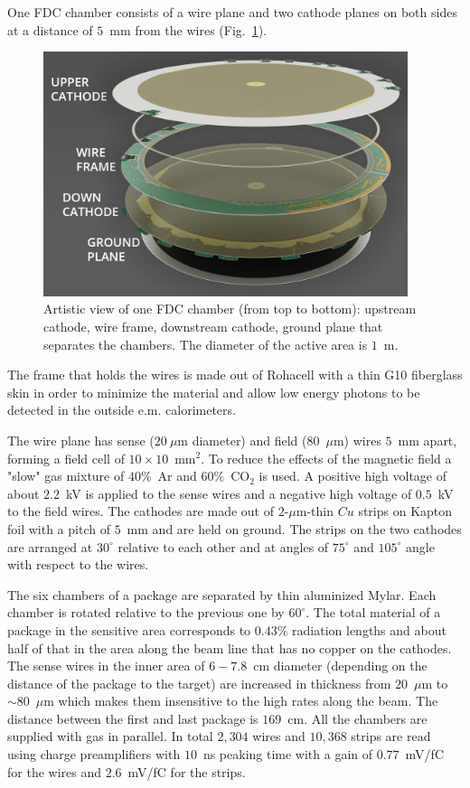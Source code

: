 One FDC chamber consists of a wire plane and two cathode planes on both sides at a distance of $5$~mm from the wires (Fig.~\ref{FDC_OneCell}).
\begin{figure}[tbp]
\begin{center}
\includegraphics[width=0.95\textwidth]{figures/FDC_OneCell2.png} 
\caption{\label{FDC_OneCell}
Artistic view of one FDC chamber (from top to bottom): upstream cathode, wire frame, downstream cathode, ground plane that separates the chambers. The diameter of the active area is $1$~m.
}
\end{center}
\end{figure}
The frame that holds the wires is made out of Rohacell with a thin
G10 fiberglass skin in order to minimize the material and
allow low energy photons to be detected in the outside e.m. calorimeters.

The wire plane has sense ($20~\mu$m diameter) and field ($80$~$\mu$m) wires $5$~mm apart, forming a field cell of $10\times 10$~mm$^2$. 
To reduce the effects of the magnetic field 
a "slow" gas mixture of $40\%$~Ar and $60\%$~CO$_2$ is used.
A positive high voltage of about $2.2$~kV is applied to the sense wires and a negative high voltage of $0.5$~kV to the field wires. 
The cathodes are made out of $2$-$\mu$m-thin $Cu$ strips on Kapton foil with a pitch of $5$~mm and are held on ground. The strips on the two cathodes are arranged at $30^\circ $ relative to each other and at angles of $75^\circ $ and $105^\circ $ angle with respect to the wires.

The six chambers of a package are separated by thin aluminized Mylar.
Each chamber is rotated relative to the previous one by $60^\circ $.
The total material of a package in the sensitive area corresponds to $0.43\%$ radiation lengths  and about half of that in the area along the beam line that has no copper on the cathodes.
The sense wires in the inner area of $6-7.8$~cm diameter (depending on the distance of the package to the target) are increased in thickness from $20$~$\mu$m to $\sim 80$~$\mu$m which makes them insensitive to the high rates along the beam.
The distance between the first and last package is $169$~cm. 
All the chambers are supplied with gas in parallel. 
In total $2,304$ wires and $10,368$ strips are read using charge preamplifiers with $10$~ns peaking time with a gain of $0.77$~mV/fC for the wires and $2.6$~mV/fC for the strips.

